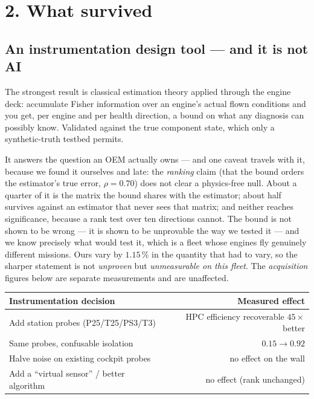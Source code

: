 \documentclass[11pt]{article}
\begin{document}
\section{2. What survived}

\subsection{An instrumentation design tool --- and it is not AI}
The strongest result is classical estimation theory applied through the engine
deck: accumulate Fisher information over an engine's actual flown conditions and
you get, per engine and per health direction, a bound on what any diagnosis can
possibly know. Validated against the true component state, which only a
synthetic-truth testbed permits.

It answers the question an OEM actually owns --- and one caveat travels with it, because we
found it ourselves and late: the \emph{ranking} claim (that the bound orders the estimator's
true error, $\rho = 0.70$) does not clear a physics-free null. About a quarter of it is the
matrix the bound shares with the estimator; about half survives against an estimator that never
sees that matrix; and neither reaches significance, because a rank test over ten directions
cannot. The bound is not shown to be wrong --- it is shown to be unprovable the way we tested
it --- and we know precisely what
would test it, which is a fleet whose engines fly genuinely different missions. Ours vary
by $1.15\,\%$ in the quantity that had to vary, so the sharper statement is not
\emph{unproven} but \emph{unmeasurable on this fleet}. The \emph{acquisition} figures below
are separate measurements and are unaffected.

\begin{center}\small
\begin{tabular}{@{}lr@{}}
  \toprule
  Instrumentation decision & Measured effect \\
  \midrule
  Add station probes (P25/T25/PS3/T3) & HPC efficiency recoverable $45\times$ better \\
  Same probes, confusable isolation & $0.15 \rightarrow 0.92$ \\
  Halve noise on existing cockpit probes & no effect on the wall \\
  Add a ``virtual sensor'' / better algorithm & no effect (rank unchanged) \\
  \bottomrule
\end{tabular}
\end{center}
\end{document}

